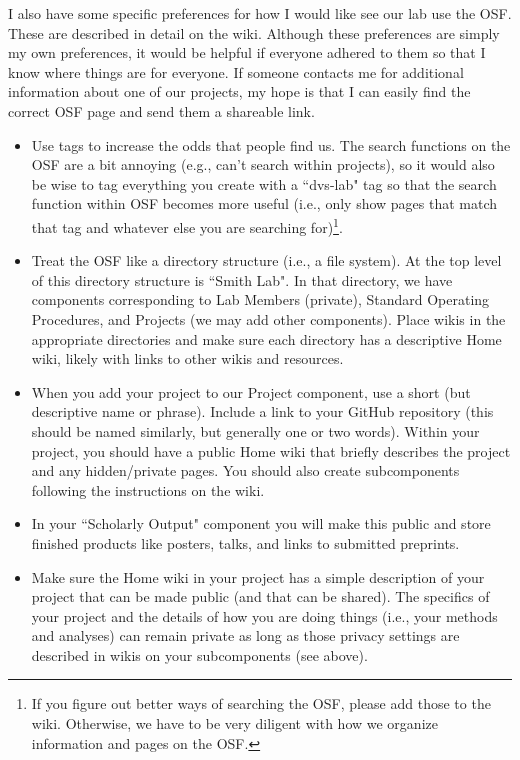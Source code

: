 \documentclass[letterpaper,12pt,oneside]{memoir}
\begin{document}
I also have some specific preferences for how I would like see our lab use the OSF. These are described in detail on the wiki. Although these preferences  are simply my own preferences, it would be helpful if everyone adhered to them so that I know where things are for everyone. If someone contacts me for additional information about one of our projects, my hope is that I can easily find the correct OSF page and send them a shareable link.

\begin{itemize}

\item Use tags to increase the odds that people find us. The search functions on the OSF are a bit annoying (e.g., can't search within projects), so it would also be wise to tag everything you create with a ``dvs-lab" tag so that the search function within OSF becomes more useful (i.e., only show pages that match that tag and whatever else you are searching for)\footnote{If you figure out better ways of searching the OSF, please add those to the wiki. Otherwise, we have to be very diligent with how we organize information and pages on the OSF.}.

\item Treat the OSF like a directory structure (i.e., a file system). At the top level of this directory structure is ``Smith Lab". In that directory, we have components corresponding to Lab Members (private), Standard Operating Procedures, and Projects (we may add other components). Place wikis in the appropriate directories and make sure each directory has a descriptive Home wiki, likely with links to other wikis and resources. 

\item When you add your project to our Project component, use a short (but descriptive name or phrase). Include a link to your GitHub repository (this should be named similarly, but generally one or two words). Within your project, you should have a public Home wiki that briefly describes the project and any hidden/private pages. You should also create subcomponents following the instructions on the wiki.

\item In your ``Scholarly Output" component you will make this public and store finished products like posters, talks, and links to submitted preprints. 

\item Make sure the Home wiki in your project has a simple description of your project that can be made public (and that can be shared). The specifics of your project and the details of how you are doing things (i.e., your methods and analyses) can remain private as long as those privacy settings are described in wikis on your subcomponents (see above). 

\end{itemize}
\end{document}
